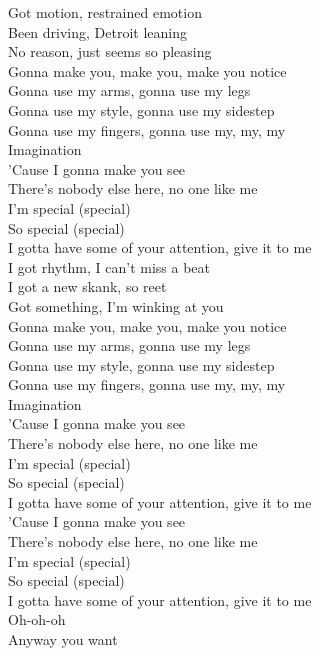 {
	Got motion, restrained emotion \\
	Been driving, Detroit leaning \\
	No reason, just seems so pleasing \\
	Gonna make you, make you, make you notice \\
	Gonna use my arms, gonna use my legs \\
	Gonna use my style, gonna use my sidestep \\
	Gonna use my fingers, gonna use my, my, my \\
	Imagination \\
	'Cause I gonna make you see \\
	There's nobody else here, no one like me \\
	I'm special (special) \\
	So special (special) \\
	I gotta have some of your attention, give it to me \\
	I got rhythm, I can't miss a beat \\
	I got a new skank, so reet \\
	Got something, I'm winking at you \\
	Gonna make you, make you, make you notice \\
	Gonna use my arms, gonna use my legs \\
	Gonna use my style, gonna use my sidestep \\
	Gonna use my fingers, gonna use my, my, my \\
	Imagination \\
	'Cause I gonna make you see \\
	There's nobody else here, no one like me \\
	I'm special (special) \\
	So special (special) \\
	I gotta have some of your attention, give it to me \\
	'Cause I gonna make you see \\
	There's nobody else here, no one like me \\
	I'm special (special) \\
	So special (special) \\
	I gotta have some of your attention, give it to me \\
	Oh-oh-oh \\
	Anyway you want \\
}

